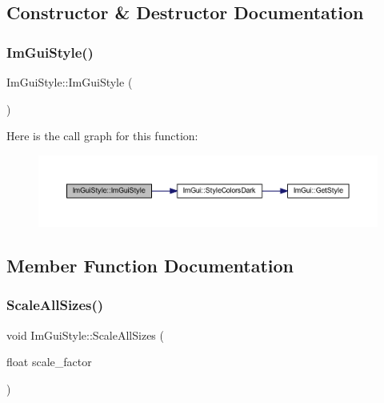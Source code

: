 \subsection{Constructor \& Destructor Documentation}
\mbox{\label{struct_im_gui_style_ab0a3ffb3aeec3e6b09b9bde812b28369}} 
\subsubsection{\texorpdfstring{Im\+Gui\+Style()}{ImGuiStyle()}}
{\footnotesize\ttfamily Im\+Gui\+Style\+::\+Im\+Gui\+Style (\begin{DoxyParamCaption}{ }\end{DoxyParamCaption})}

Here is the call graph for this function\+:
\nopagebreak
\begin{figure}[H]
\begin{center}
\leavevmode
\includegraphics[width=350pt]{struct_im_gui_style_ab0a3ffb3aeec3e6b09b9bde812b28369_cgraph}
\end{center}
\end{figure}


\subsection{Member Function Documentation}
\mbox{\label{struct_im_gui_style_a7c9d3e0974a239f65e433cc952be0627}} 
\subsubsection{\texorpdfstring{Scale\+All\+Sizes()}{ScaleAllSizes()}}
{\footnotesize\ttfamily void Im\+Gui\+Style\+::\+Scale\+All\+Sizes (\begin{DoxyParamCaption}\item[{float}]{scale\+\_\+factor }\end{DoxyParamCaption})}



